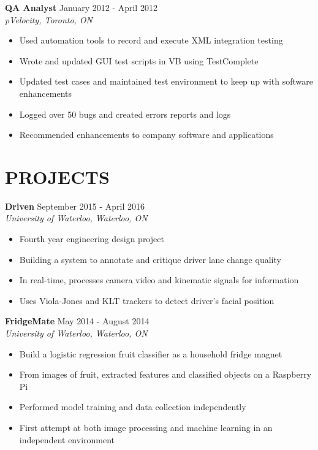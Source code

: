 \documentclass[10pt]{res} %
\begin{document}
\begin{resume}
\textbf{QA Analyst} \hfill January 2012 - April 2012 \\[2pt]
{\sl pVelocity, Toronto, ON} 
\begin{itemize}  %
    \item Used automation tools to record and execute XML integration testing
    \item Wrote and updated GUI test scripts in VB using TestComplete
    \item Updated test cases and maintained test environment to keep up with software enhancements
    \item Logged over 50 bugs and created errors reports and logs
    \item Recommended enhancements to company software and applications
\end{itemize}


\vspace{0.2in} %


\section{PROJECTS} 

\vspace{0.2in} %

\textbf{Driven} \hfill September 2015 - April 2016 \\
{\sl University of Waterloo, Waterloo, ON }
\begin{itemize} 
    \item Fourth year engineering design project
    \item Building a system to annotate and critique driver lane change quality
    \item In real-time, processes camera video and kinematic signals for information
    \item Uses Viola-Jones and KLT trackers to detect driver's facial position
\end{itemize}

\textbf{FridgeMate} \hfill May 2014 - August 2014 \\
{\sl University of Waterloo, Waterloo, ON }
\begin{itemize}  %
    \item Build a logistic regression fruit classifier as a household fridge magnet
    \item From images of fruit, extracted features and classified objects on a Raspberry Pi
    \item Performed model training and data collection independently
    \item First attempt at both image processing and machine learning in an independent environment
\end{itemize}


\end{resume}
\end{document}
